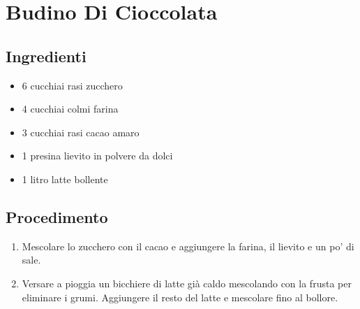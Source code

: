 \section{Budino Di Cioccolata}
\subsection{Ingredienti}
\begin{itemize}
\item 6 cucchiai rasi zucchero  
\item 4 cucchiai colmi farina   
\item 3 cucchiai rasi cacao amaro  
\item 1 presina lievito in polvere da dolci  
\item 1 litro latte bollente
\end{itemize}
\subsection{Procedimento}
\begin{enumerate}
\item  Mescolare lo zucchero con il cacao e aggiungere la farina, il lievito e un po' di sale.  
\item  Versare a pioggia un bicchiere di latte già caldo mescolando con la frusta per eliminare i grumi. Aggiungere il resto del latte e mescolare fino al bollore.
\end{enumerate}
